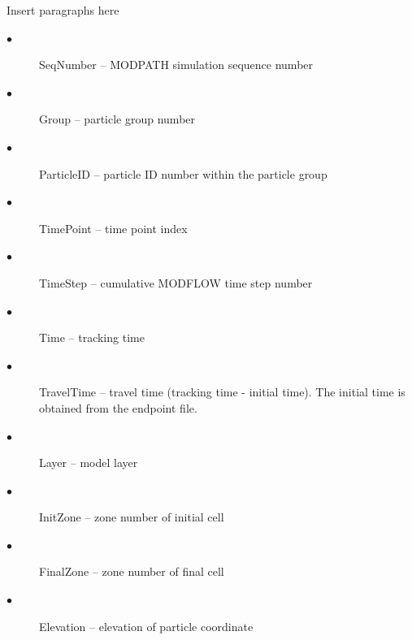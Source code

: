 \documentclass[11pt,twoside,twocolumn]{usgsreport}
\begin{document}
Insert paragraphs here

\begin{description}
  \item[$\bullet$ ] SeqNumber -- MODPATH simulation sequence number
  \item[$\bullet$ ] Group -- particle group number
  \item[$\bullet$ ] ParticleID -- particle ID number within the particle group
  \item[$\bullet$ ] TimePoint -- time point index
  \item[$\bullet$ ] TimeStep -- cumulative MODFLOW time step number
  \item[$\bullet$ ] Time -- tracking time
  \item[$\bullet$ ] TravelTime -- travel time (tracking time - initial time). The initial time is obtained from the endpoint file.
  \item[$\bullet$ ] Layer -- model layer
  \item[$\bullet$ ] InitZone -- zone number of initial cell
  \item[$\bullet$ ] FinalZone -- zone number of final cell
  \item[$\bullet$ ] Elevation -- elevation of particle coordinate
\end{description}

\vspace*{\fill}
\clearpage
\pagestyle{backofreport}
\makebackcover
\end{document}
